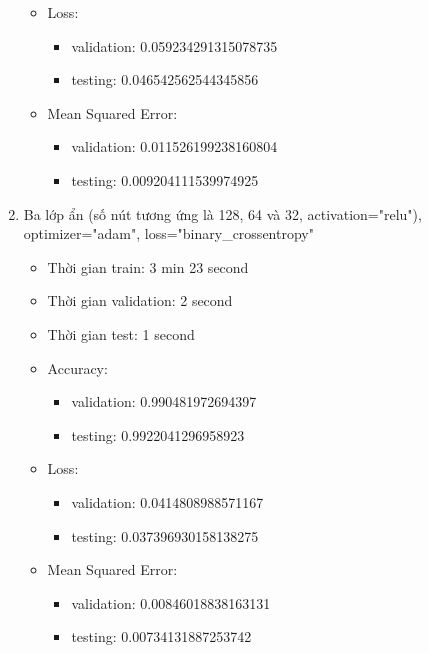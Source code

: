 \documentclass{article}
\begin{document}
\begin{enumerate}
\begin{itemize}
\begin{itemize}
		            \end{itemize}
		      \item Loss:
		            \begin{itemize}
			            \item validation: 0.059234291315078735
			            \item testing: 0.046542562544345856
		            \end{itemize}
		      \item Mean Squared Error:
		            \begin{itemize}
			            \item validation: 0.011526199238160804
			            \item testing: 0.009204111539974925
		            \end{itemize}
	      \end{itemize}
	\item Ba lớp ẩn (số nút tương ứng là 128, 64 và 32, activation="relu"), optimizer="adam", loss="binary\_crossentropy"
	      \begin{itemize}
		      \item Thời gian train: 3 min 23 second
		      \item Thời gian validation: 2 second
		      \item Thời gian test: 1 second
		      \item Accuracy:
		            \begin{itemize}
			            \item validation: 0.990481972694397
			            \item testing: 0.9922041296958923
		            \end{itemize}
		      \item Loss:
		            \begin{itemize}
			            \item validation: 0.0414808988571167
			            \item testing: 0.037396930158138275
		            \end{itemize}
		      \item Mean Squared Error:
		            \begin{itemize}
			            \item validation: 0.00846018838163131
			            \item testing: 0.00734131887253742
		            \end{itemize}
	      \end{itemize}
\end{enumerate}
\end{document}
